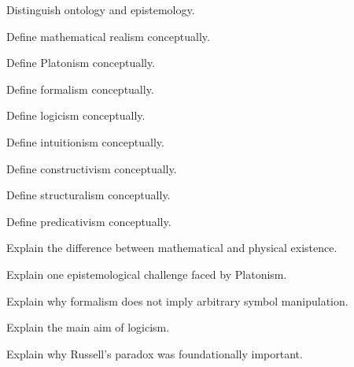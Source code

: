 \begin{exercise}[1]
Distinguish ontology and epistemology.
\end{exercise}

\begin{exercise}[1]
Define mathematical realism conceptually.
\end{exercise}

\begin{exercise}[1]
Define Platonism conceptually.
\end{exercise}

\begin{exercise}[1]
Define formalism conceptually.
\end{exercise}

\begin{exercise}[1]
Define logicism conceptually.
\end{exercise}

\begin{exercise}[1]
Define intuitionism conceptually.
\end{exercise}

\begin{exercise}[1]
Define constructivism conceptually.
\end{exercise}

\begin{exercise}[1]
Define structuralism conceptually.
\end{exercise}

\begin{exercise}[1]
Define predicativism conceptually.
\end{exercise}

\begin{exercise}[2]
Explain the difference between mathematical and physical existence.
\end{exercise}

\begin{exercise}[2]
Explain one epistemological challenge faced by Platonism.
\end{exercise}

\begin{exercise}[2]
Explain why formalism does not imply arbitrary symbol manipulation.
\end{exercise}

\begin{exercise}[2]
Explain the main aim of logicism.
\end{exercise}

\begin{exercise}[2]
Explain why Russell's paradox was foundationally important.
\end{exercise}

